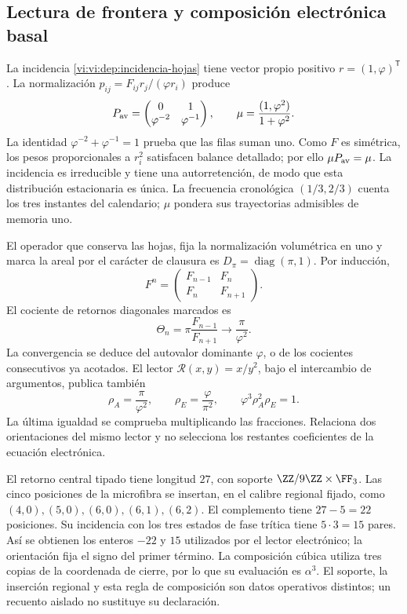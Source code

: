 \subsection{Lectura de frontera y composición electrónica basal}
\label{vi:vi:dep:basal}

La incidencia \eqref{vi:vi:dep:incidencia-hojas} tiene vector propio
positivo \(r=(1,\varphi)^{\mathsf T}\). La normalización
\(p_{ij}=F_{ij}r_j/(\varphi r_i)\) produce
\[
 P_{\rm av}=\begin{pmatrix}0&1\\\varphi^{-2}&\varphi^{-1}\end{pmatrix},
 \qquad \mu=\frac{(1,\varphi^2)}{1+\varphi^2}.
\]
La identidad \(\varphi^{-2}+\varphi^{-1}=1\) prueba que las filas
suman uno. Como \(F\) es simétrica, los pesos proporcionales a
\(r_i^2\) satisfacen balance detallado; por ello \(\mu P_{\rm av}=\mu\).
La incidencia es irreducible y tiene una autorretención, de modo que
esta distribución estacionaria es única. La frecuencia cronológica
\((1/3,2/3)\) cuenta los tres instantes del calendario; \(\mu\)
pondera sus trayectorias admisibles de memoria uno.

El operador que conserva las hojas, fija la normalización volumétrica
en uno y marca la areal por el carácter de clausura es
\(D_\pi=\operatorname{diag}(\pi,1)\). Por inducción,
\[
 F^n=\begin{pmatrix}F_{n-1}&F_n\\F_n&F_{n+1}\end{pmatrix}.
\]
El cociente de retornos diagonales marcados es
\[
 \Theta_n=\pi\frac{F_{n-1}}{F_{n+1}}
 \longrightarrow\frac{\pi}{\varphi^2}.
\]
La convergencia se deduce del autovalor dominante \(\varphi\), o de
los cocientes consecutivos ya acotados. El lector
\(\mathcal R(x,y)=x/y^2\), bajo el intercambio de argumentos,
publica también
\begin{equation}
 \rho_A=\frac{\pi}{\varphi^2},\qquad
 \rho_E=\frac{\varphi}{\pi^2},\qquad
 \varphi^3\rho_A^2\rho_E=1.
 \label{vi:vi:dep:dos-orientaciones}
\end{equation}
La última igualdad se comprueba multiplicando las fracciones.
Relaciona dos orientaciones del mismo lector y no selecciona los
restantes coeficientes de la ecuación electrónica.

El retorno central tipado tiene longitud \(27\), con soporte
\(\ZZ/9\ZZ\times\FF_3\). Las cinco posiciones de la microfibra
se insertan, en el calibre regional fijado, como
\((4,0),(5,0),(6,0),(6,1),(6,2)\).
El complemento tiene \(27-5=22\) posiciones. Su incidencia con los
tres estados de fase trítica tiene \(5\cdot3=15\) pares.
Así se obtienen los enteros \(-22\) y \(15\) utilizados por el
lector electrónico; la orientación fija el signo del primer término.
La composición cúbica utiliza tres copias de la coordenada de cierre,
por lo que su evaluación es \(\alpha^3\). El soporte, la inserción
regional y esta regla de composición son datos operativos distintos;
un recuento aislado no sustituye su declaración.

